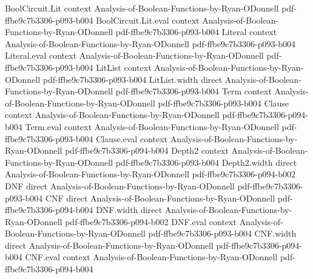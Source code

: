 \begin{theorem}
\label{DecisionTree.sparsity_le_four_pow}
\leanok
{}
\proofstep
  {BoolCircuit.Lit}
  {context}
  {Analysis-of-Boolean-Functions-by-Ryan-ODonnell}
  {pdf-ffbe9c7b3306-p093-b004}
\proofstep
  {BoolCircuit.Lit.eval}
  {context}
  {Analysis-of-Boolean-Functions-by-Ryan-ODonnell}
  {pdf-ffbe9c7b3306-p093-b004}
\proofstep
  {Literal}
  {context}
  {Analysis-of-Boolean-Functions-by-Ryan-ODonnell}
  {pdf-ffbe9c7b3306-p093-b004}
\proofstep
  {Literal.eval}
  {context}
  {Analysis-of-Boolean-Functions-by-Ryan-ODonnell}
  {pdf-ffbe9c7b3306-p093-b004}
\proofstep
  {LitList}
  {context}
  {Analysis-of-Boolean-Functions-by-Ryan-ODonnell}
  {pdf-ffbe9c7b3306-p093-b004}
\proofstep
  {LitList.width}
  {direct}
  {Analysis-of-Boolean-Functions-by-Ryan-ODonnell}
  {pdf-ffbe9c7b3306-p093-b004}
\proofstep
  {Term}
  {context}
  {Analysis-of-Boolean-Functions-by-Ryan-ODonnell}
  {pdf-ffbe9c7b3306-p093-b004}
\proofstep
  {Clause}
  {context}
  {Analysis-of-Boolean-Functions-by-Ryan-ODonnell}
  {pdf-ffbe9c7b3306-p094-b004}
\proofstep
  {Term.eval}
  {context}
  {Analysis-of-Boolean-Functions-by-Ryan-ODonnell}
  {pdf-ffbe9c7b3306-p093-b004}
\proofstep
  {Clause.eval}
  {context}
  {Analysis-of-Boolean-Functions-by-Ryan-ODonnell}
  {pdf-ffbe9c7b3306-p094-b004}
\proofstep
  {Depth2}
  {context}
  {Analysis-of-Boolean-Functions-by-Ryan-ODonnell}
  {pdf-ffbe9c7b3306-p093-b004}
\proofstep
  {Depth2.width}
  {direct}
  {Analysis-of-Boolean-Functions-by-Ryan-ODonnell}
  {pdf-ffbe9c7b3306-p094-b002}
\proofstep
  {DNF}
  {direct}
  {Analysis-of-Boolean-Functions-by-Ryan-ODonnell}
  {pdf-ffbe9c7b3306-p093-b004}
\proofstep
  {CNF}
  {direct}
  {Analysis-of-Boolean-Functions-by-Ryan-ODonnell}
  {pdf-ffbe9c7b3306-p094-b004}
\proofstep
  {DNF.width}
  {direct}
  {Analysis-of-Boolean-Functions-by-Ryan-ODonnell}
  {pdf-ffbe9c7b3306-p094-b002}
\proofstep
  {DNF.eval}
  {context}
  {Analysis-of-Boolean-Functions-by-Ryan-ODonnell}
  {pdf-ffbe9c7b3306-p093-b004}
\proofstep
  {CNF.width}
  {direct}
  {Analysis-of-Boolean-Functions-by-Ryan-ODonnell}
  {pdf-ffbe9c7b3306-p094-b004}
\proofstep
  {CNF.eval}
  {context}
  {Analysis-of-Boolean-Functions-by-Ryan-ODonnell}
  {pdf-ffbe9c7b3306-p094-b004}
\proofstep

\end{theorem}
